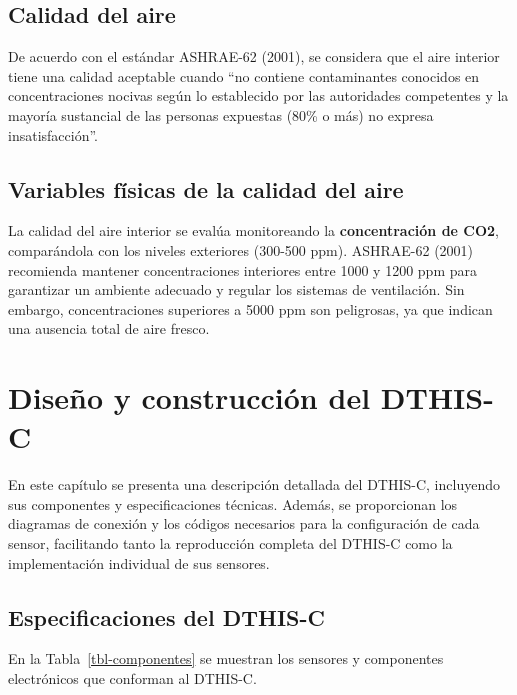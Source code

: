 \documentclass[
  letterpaper,
]{scrbook}
\begin{document}
\section{Calidad del aire}\label{calidad-del-aire}

De acuerdo con el estándar ASHRAE-62 (2001), se considera que el aire
interior tiene una calidad aceptable cuando ``no contiene contaminantes
conocidos en concentraciones nocivas según lo establecido por las
autoridades competentes y la mayoría sustancial de las personas
expuestas (80\% o más) no expresa insatisfacción''.

\section{Variables físicas de la calidad del
aire}\label{variables-fuxedsicas-de-la-calidad-del-aire}

La calidad del aire interior se evalúa monitoreando la
\textbf{concentración de CO2}, comparándola con los niveles exteriores
(300-500 ppm). ASHRAE-62 (2001) recomienda mantener concentraciones
interiores entre 1000 y 1200 ppm para garantizar un ambiente adecuado y
regular los sistemas de ventilación. Sin embargo, concentraciones
superiores a 5000 ppm son peligrosas, ya que indican una ausencia total
de aire fresco.


\chapter{Diseño y construcción del
DTHIS-C}\label{diseuxf1o-y-construcciuxf3n-del-dthis-c}

En este capítulo se presenta una descripción detallada del DTHIS-C,
incluyendo sus componentes y especificaciones técnicas. Además, se
proporcionan los diagramas de conexión y los códigos necesarios para la
configuración de cada sensor, facilitando tanto la reproducción completa
del DTHIS-C como la implementación individual de sus sensores.

\section{Especificaciones del
DTHIS-C}\label{especificaciones-del-dthis-c}

En la Tabla~\ref{tbl-componentes} se muestran los sensores y componentes
electrónicos que conforman al DTHIS-C.
\end{document}
